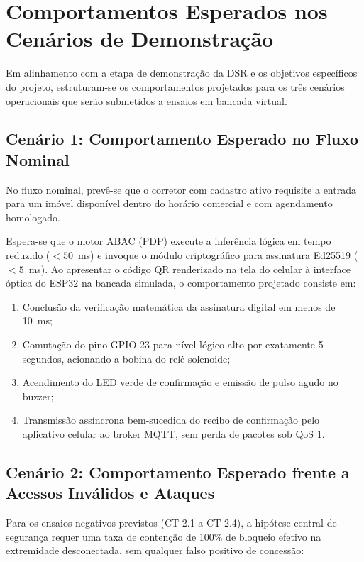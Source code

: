 \section{Comportamentos Esperados nos Cenários de Demonstração}
\label{sec:resultados-demonstracao}

Em alinhamento com a etapa de demonstração da DSR e os objetivos específicos do projeto, estruturam-se os comportamentos projetados para os três cenários operacionais que serão submetidos a ensaios em bancada virtual.

\subsection{Cenário 1: Comportamento Esperado no Fluxo Nominal}
\label{subsec:res-cenario-1}

No fluxo nominal, prevê-se que o corretor com cadastro ativo requisite a entrada para um imóvel disponível dentro do horário comercial e com agendamento homologado.

Espera-se que o motor ABAC (PDP) execute a inferência lógica em tempo reduzido ($< 50$~ms) e invoque o módulo criptográfico para assinatura Ed25519 ($< 5$~ms). Ao apresentar o código QR renderizado na tela do celular à interface óptica do ESP32 na bancada simulada, o comportamento projetado consiste em:
\begin{enumerate}
    \item Conclusão da verificação matemática da assinatura digital em menos de 10~ms;
    \item Comutação do pino GPIO 23 para nível lógico alto por exatamente 5 segundos, acionando a bobina do relé solenoide;
    \item Acendimento do LED verde de confirmação e emissão de pulso agudo no buzzer;
    \item Transmissão assíncrona bem-sucedida do recibo de confirmação pelo aplicativo celular ao broker MQTT, sem perda de pacotes sob QoS 1.
\end{enumerate}

\subsection{Cenário 2: Comportamento Esperado frente a Acessos Inválidos e Ataques}
\label{subsec:res-cenario-2}

Para os ensaios negativos previstos (CT-2.1 a CT-2.4), a hipótese central de segurança requer uma taxa de contenção de 100\% de bloqueio efetivo na extremidade desconectada, sem qualquer falso positivo de concessão:

